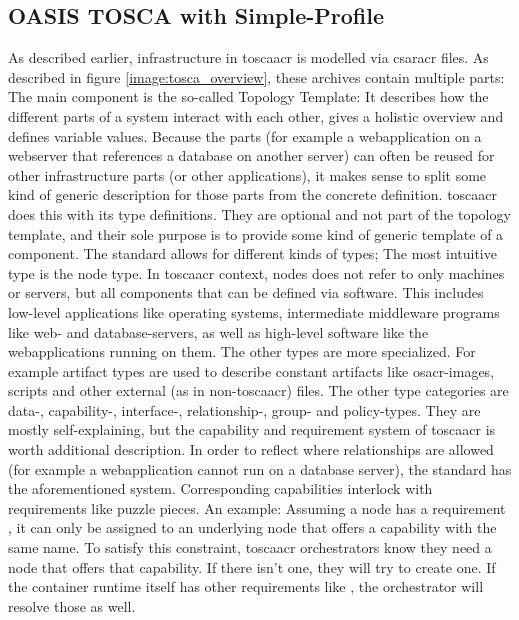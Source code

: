 \subsection{OASIS TOSCA with Simple-Profile}
As described earlier, infrastructure in \gls{toscaacr} is modelled via \gls{csaracr} files. As described in figure \ref{image:tosca_overview}, these archives contain multiple parts: The main component is the so-called Topology Template: It describes how the different parts of a system interact with each other, gives a holistic overview and defines variable values. Because the parts (for example a webapplication on a webserver that references a database on another server) can often be reused for other infrastructure parts (or other applications), it makes sense to split some kind of generic description for those parts from the concrete definition. \Gls{toscaacr} does this with its type definitions. They are optional and not part of the topology template, and their sole purpose is to provide some kind of generic template of a component. The standard allows for different kinds of types; The most intuitive type is the node type. In \gls{toscaacr} context, nodes does not refer to only machines or servers, but all components that can be defined via software. This includes low-level applications like operating systems, intermediate middleware programs like web- and database-servers, as well as high-level software like the webapplications running on them. The other types are more specialized. For example artifact types are used to describe constant artifacts like \gls{osacr}-images, scripts and other external (as in non-\gls{toscaacr}) files. The other type categories are data-, capability-, interface-, relationship-, group- and policy-types. They are mostly self-explaining, but the capability and requirement system of \gls{toscaacr} is worth additional description. In order to reflect where relationships are allowed (for example a webapplication cannot run on a database server), the standard has the aforementioned system. Corresponding capabilities interlock with requirements like puzzle pieces. An example: Assuming a node has a requirement , it can only be assigned to an underlying node that offers a capability with the same name. To satisfy this constraint, \gls{toscaacr} orchestrators know they need a node that offers that capability. If there isn't one, they will try to create one. If the container runtime itself has other requirements like , the orchestrator will resolve those as well.

